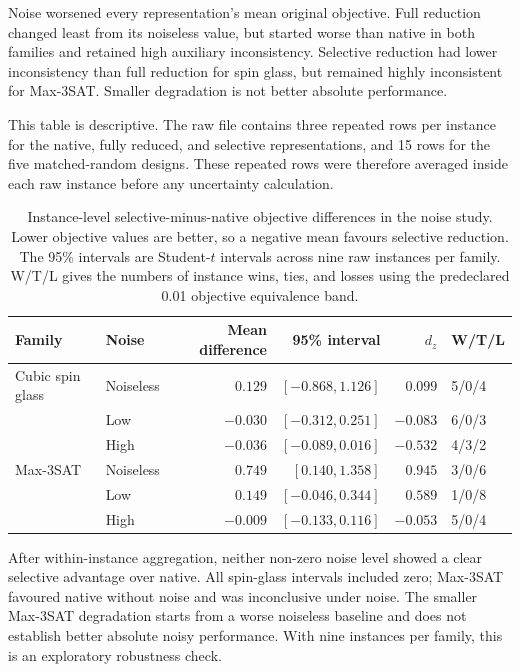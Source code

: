 \documentclass[a4paper,onecolumn,11pt,unpublished]{quantumarticle}
\theoremstyle{remark}
\begin{document}
Noise worsened every representation's mean original objective. Full reduction
changed least from its noiseless value, but started worse than native in both
families and retained high auxiliary inconsistency. Selective reduction had
lower inconsistency than full reduction for spin glass, but remained highly
inconsistent for Max-3SAT. Smaller degradation is not better absolute performance.

This table is descriptive.  The raw file contains three repeated rows per
instance for the native, fully reduced, and selective representations, and 15
rows for the five matched-random designs.  These repeated rows were therefore
averaged inside each raw instance before any uncertainty calculation.

\begin{table}[!htbp]
    \centering
    \small
    \caption{Instance-level selective-minus-native objective differences in
    the noise study.  Lower objective values are better, so a negative mean
    favours selective reduction.  The 95\% intervals are Student-$t$
    intervals across nine raw instances per family.  W/T/L gives the numbers
    of instance wins, ties, and losses using the predeclared 0.01 objective
    equivalence band.}
    \label{tab:e6-paired-noise}
    \begin{tabular}{@{}llrrrl@{}}
        \toprule
        Family & Noise & Mean difference & 95\% interval & $d_z$ & W/T/L\\
        \midrule
        Cubic spin glass & Noiseless & $0.129$  & $[-0.868,1.126]$ & $0.099$  & 5/0/4\\
                          & Low       & $-0.030$ & $[-0.312,0.251]$ & $-0.083$ & 6/0/3\\
                          & High      & $-0.036$ & $[-0.089,0.016]$ & $-0.532$ & 4/3/2\\
        \addlinespace
        Max-3SAT         & Noiseless & $0.749$  & $[0.140,1.358]$  & $0.945$  & 3/0/6\\
                          & Low       & $0.149$  & $[-0.046,0.344]$ & $0.589$  & 1/0/8\\
                          & High      & $-0.009$ & $[-0.133,0.116]$ & $-0.053$ & 5/0/4\\
        \bottomrule
    \end{tabular}
\end{table}

After within-instance aggregation, neither non-zero noise level showed a
clear selective advantage over native. All spin-glass intervals included zero;
Max-3SAT favoured native without noise and was inconclusive under noise.
The smaller Max-3SAT degradation starts from a worse noiseless baseline and
does not establish better absolute noisy performance. With nine instances
per family, this is an exploratory robustness check.
\end{document}
